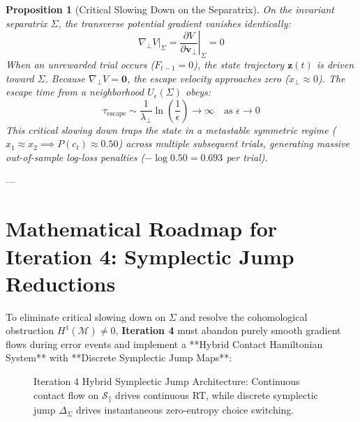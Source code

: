 \documentclass[11pt,a4paper]{article}
\newtheorem{proposition}[theorem]{Proposition}
\begin{document}
\begin{proposition}[Critical Slowing Down on the Separatrix]
On the invariant separatrix $\Sigma$, the transverse potential gradient vanishes identically:
\begin{equation}
\nabla_\perp V|_{\Sigma} = \left. \frac{\partial V}{\partial \mathbf{v}_\perp} \right|_{\Sigma} = 0
\end{equation}
When an unrewarded trial occurs ($F_{t-1} = 0$), the state trajectory $\mathbf{z}(t)$ is driven toward $\Sigma$. Because $\nabla_\perp V = \mathbf{0}$, the escape velocity approaches zero ($\dot{x}_\perp \approx 0$). The escape time from a neighborhood $U_\epsilon(\Sigma)$ obeys:
\begin{equation}
\tau_{\text{escape}} \sim \frac{1}{\lambda_\perp} \ln \left( \frac{1}{\epsilon} \right) \to \infty \quad \text{as } \epsilon \to 0
\end{equation}
This critical slowing down traps the state in a metastable symmetric regime ($x_1 \approx x_2 \implies P(c_t) \approx 0.50$) across multiple subsequent trials, generating massive out-of-sample log-loss penalties ($-\log 0.50 = 0.693$ per trial).
\end{proposition}

---

\section{Mathematical Roadmap for Iteration 4: Symplectic Jump Reductions}

To eliminate critical slowing down on $\Sigma$ and resolve the cohomological obstruction $H^1(\mathcal{M}) \neq 0$, \textbf{Iteration 4} must abandon purely smooth gradient flows during error events and implement a **Hybrid Contact Hamiltonian System** with **Discrete Symplectic Jump Maps**:

\begin{figure}[H]
\centering
{}
\caption{Iteration 4 Hybrid Symplectic Jump Architecture: Continuous contact flow on $\mathcal{S}_\parallel$ drives continuous RT, while discrete symplectic jump $\Delta_\Sigma$ drives instantaneous zero-entropy choice switching.}
\label{fig:iteration4_symplectic}
\end{figure}
\end{document}

